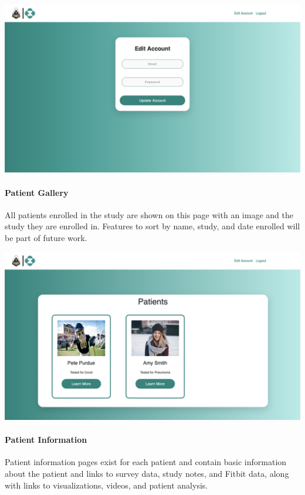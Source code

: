 \documentclass[]{book}
\let\oldparagraph\paragraph
\renewcommand{\paragraph}[1]{\oldparagraph{#1}\mbox{}}
\begin{document}
\includegraphics{images/Edit_Account.png}

\hypertarget{patient-gallery}{%
\paragraph{Patient Gallery}\label{patient-gallery}}

All patients enrolled in the study are shown on this page with an image and the study they are enrolled in. Features to sort by name, study, and date enrolled will be part of future work.

\includegraphics{images/Patients_gallery_page.png}

\hypertarget{patient-information}{%
\paragraph{Patient Information}\label{patient-information}}

Patient information pages exist for each patient and contain basic information about the patient and links to survey data, study notes, and Fitbit data, along with links to visualizations, videos, and patient analysis.
\end{document}
